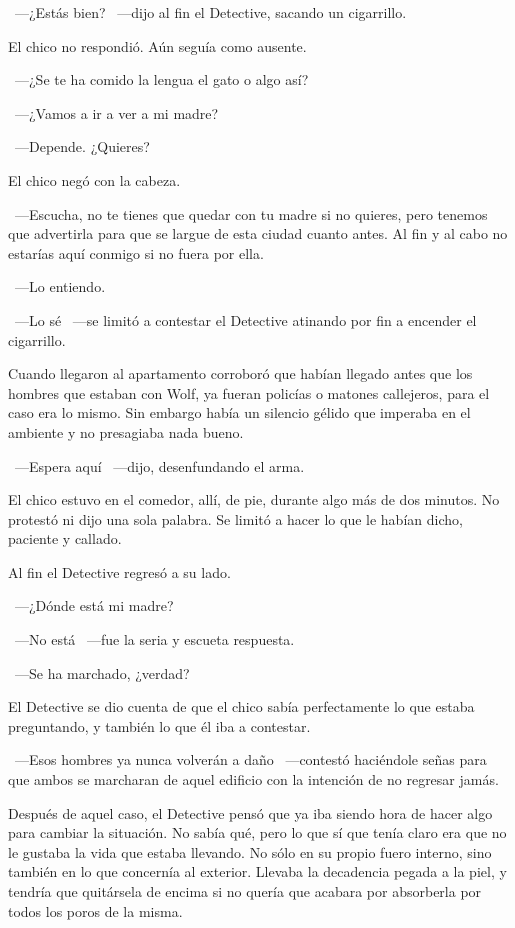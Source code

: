 ~---¿Estás bien? ~---dijo al fin el Detective, sacando un cigarrillo.

El chico no respondió. Aún seguía como ausente.

~---¿Se te ha comido la lengua el gato o algo así?

~---¿Vamos a ir a ver a mi madre?

~---Depende. ¿Quieres?

El chico negó con la cabeza.

~---Escucha, no te tienes que quedar con tu madre si no quieres, pero tenemos que advertirla para que se largue de esta ciudad cuanto antes. Al fin y al cabo no estarías aquí conmigo si no fuera por ella.

~---Lo entiendo.

~---Lo sé ~---se limitó a contestar el Detective atinando por fin a encender el cigarrillo.

Cuando llegaron al apartamento corroboró que habían llegado antes que los hombres que estaban con Wolf, ya fueran policías o matones callejeros, para el caso era lo mismo. Sin embargo había un silencio gélido que imperaba en el ambiente y no presagiaba nada bueno.

~---Espera aquí ~---dijo, desenfundando el arma.

El chico estuvo en el comedor, allí, de pie, durante algo más de dos minutos. No protestó ni dijo una sola palabra. Se limitó a hacer lo que le habían dicho, paciente y callado.

Al fin el Detective regresó a su lado.

~---¿Dónde está mi madre?

~---No está ~---fue la seria y escueta respuesta.

~---Se ha marchado, ¿verdad?

El Detective se dio cuenta de que el chico sabía perfectamente lo que estaba preguntando, y también lo que él iba a contestar.

~---Esos hombres ya nunca volverán a  daño ~---contestó haciéndole señas para que ambos se marcharan de aquel edificio con la intención de no regresar jamás.

\parbreak
Después de aquel caso, el Detective pensó que ya iba siendo hora de hacer algo para cambiar la situación. No sabía qué, pero lo que sí que tenía claro era que no le gustaba la vida que estaba llevando. No sólo en su propio fuero interno, sino también en lo que concernía al exterior. Llevaba la decadencia pegada a la piel, y tendría que quitársela de encima si no quería que acabara por absorberla por todos los poros de la misma.

